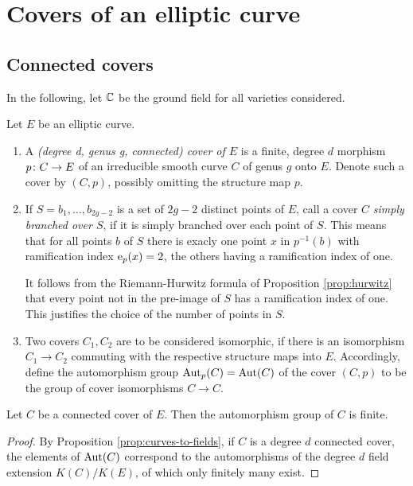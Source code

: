 \section{Covers of an elliptic curve} \label{sec:covers-definitions}

\subsection{Connected covers}

In the following, let $\mathbb{C}$ be the ground field for all varieties considered.

\begin{defi} Let $E$ be an elliptic curve. 
 \begin{enumerate}
  \item A \emph{(degree d, genus g, connected) cover of $E$} is a finite, degree $d$ morphism $p\colon C\to E$ of an irreducible smooth curve $C$ of genus $g$ onto $E$. Denote such a cover by $(C,p)$, possibly omitting the structure map $p$.

  \item If $S={b_1,\dotsc,b_{2g-2}}$ is a set of $2g-2$ distinct points of $E$, call a cover $C$ \emph{simply branched over $S$}, if it is simply branched over each point of $S$. This means that for all points $b$ of $S$ there is exacly one point $x$ in $p^{-1}(b)$ with ramification index $\operatorname{e}_p(x)=2$, the others having a ramification index of one.
  
  It follows from the Riemann-Hurwitz formula of Proposition \ref{prop:hurwitz} that every point not in the pre-image of $S$ has a ramification index of one. This justifies the choice of the number of points in $S$.

  \item Two covers $C_1, C_2$ are to be considered isomorphic, if there is an isomorphism $C_1\to C_2$ commuting with the respective structure maps into $E$. Accordingly, define the automorphism group $\operatorname{Aut}_p(C)=\operatorname{Aut}(C)$ of the cover $(C,p)$ to be the group of cover isomorphisms $C\to C$. 
 \end{enumerate}
\end{defi}

\begin{prop}
 Let $C$ be a connected cover of $E$. Then the automorphism group of $C$ is finite.
\end{prop}

\begin{proof}
 By Proposition \ref{prop:curves-to-fields}, if $C$ is a degree $d$ connected cover, the elements of $\operatorname{Aut}(C)$ correspond to the automorphisms of the degree $d$ field extension $K(C)/K(E)$, of which only finitely many exist.
\end{proof}


